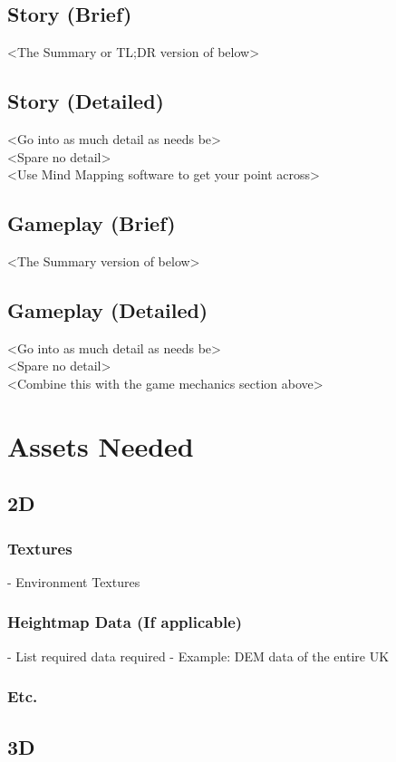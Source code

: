 \documentclass[14pt]{article}
\begin{document}
\subsection{Story (Brief)}
<The Summary or TL;DR version of below>

\subsection{Story (Detailed)}
<Go into as much detail as needs be> \\
<Spare no detail> \\
<Use Mind Mapping software to get your point across>

\subsection{Gameplay (Brief)}
<The Summary version of below>

\subsection{Gameplay (Detailed)}
<Go into as much detail as needs be> \\
<Spare no detail> \\
<Combine this with the game mechanics section above>


\pagebreak
\section{Assets Needed}
\subsection{2D}
\subsubsection{Textures}
- Environment Textures

\subsubsection{Heightmap Data (If applicable)}
- List required data required - Example: DEM data of the entire UK

\subsubsection{Etc.}

\subsection{3D}
\end{document}

